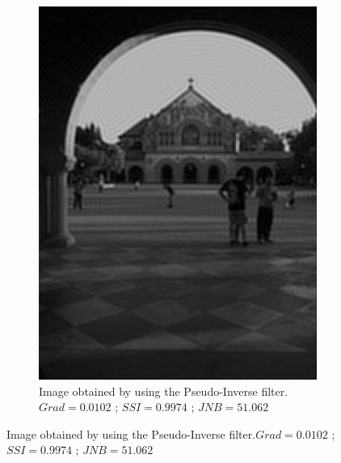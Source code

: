 \begin{figure}[H]
\begin{subfigure}[b]{0.35\textwidth}
                 \includegraphics[width=\textwidth]{memchu_pinv.jpg}
                 \caption{Image obtained by using the Pseudo-Inverse filter.\newline $Grad=0.0102$ ; $SSI=0.9974$ ; $JNB=51.062$}
        \end{subfigure} 
        

\end{figure}
